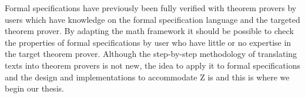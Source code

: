 Formal specifications have previously been fully verified with theorem provers
by users which have knowledge on the formal specification language and the
targeted theorem prover. By adapting the \gls{math} framework it should be
possible to check the properties of formal specifications by user who have
little or no expertise in the target theorem prover. Although the step-by-step
methodology of translating texts into theorem provers is not new, the idea to
apply it to formal specifications and the design and implementations to
accommodate Z is and this is where we begin our thesis.